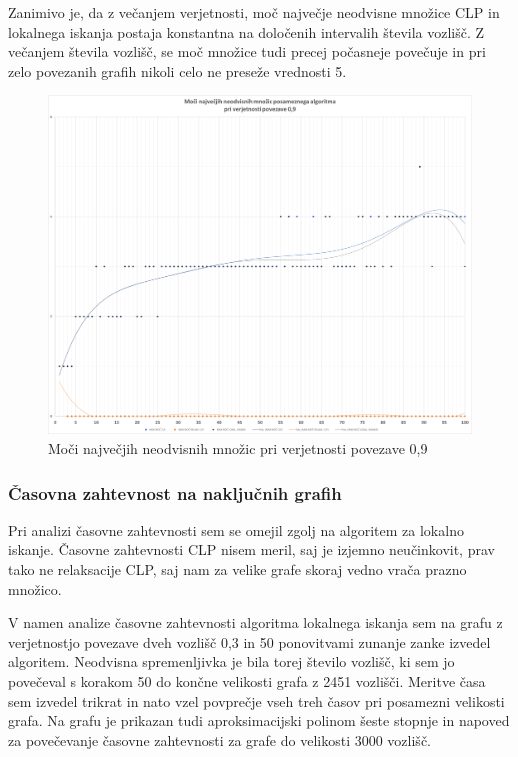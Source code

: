 \documentclass[a4paper, 12 pt]{article}
\theoremstyle{definition}
\theoremstyle{plain}
\theoremstyle{remark}
\begin{document}
Zanimivo je, da z večanjem verjetnosti, moč največje neodvisne množice CLP in lokalnega iskanja postaja konstantna na določenih intervalih števila vozlišč. Z večanjem števila vozlišč, se moč množice tudi precej počasneje povečuje in pri zelo povezanih grafih nikoli celo ne preseže vrednosti 5.


\begin{figure}[H]
\centering
  \includegraphics[scale=0.28]{./Slike/0,9 moci.png}
  \caption{Moči največjih neodvisnih množic pri verjetnosti povezave 0,9}
  \label{fig:moc0,9} 
\end{figure}

\subsubsection{Časovna zahtevnost na naključnih grafih} %
Pri analizi časovne zahtevnosti sem se omejil zgolj na algoritem za lokalno iskanje. Časovne zahtevnosti CLP nisem meril, saj je izjemno neučinkovit,  prav tako ne relaksacije CLP, saj nam za velike grafe skoraj vedno vrača prazno množico.

V namen analize časovne zahtevnosti algoritma lokalnega iskanja sem na grafu z verjetnostjo povezave dveh vozlišč 0,3 in 50 ponovitvami zunanje zanke izvedel algoritem. Neodvisna spremenljivka je bila torej število vozlišč, ki sem jo povečeval s korakom 50 do končne velikosti grafa z 2451 vozlišči. Meritve časa sem izvedel trikrat in nato vzel povprečje vseh treh časov pri posamezni velikosti grafa. Na grafu je prikazan tudi aproksimacijski polinom šeste stopnje in napoved za povečevanje časovne zahtevnosti za grafe do velikosti 3000 vozlišč.
\end{document}
